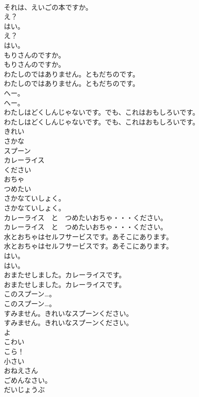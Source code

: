 \documentclass[8pt]{extreport}
\begin{document}
\begin{CJK}{UTF8}{min}
\\	それは、えいごの本ですか。 
\\	え？
\\	はい。	
\\	え？
\\	はい。 
\\	もりさんのですか。
\\	もりさんのですか。 
\\	わたしのではありません。ともだちのです。	
\\	わたしのではありません。ともだちのです。 
\\	へー。
\\	へー。
\\	わたしはどくしんじゃないです。でも、これはおもしろいです。	
\\	わたしはどくしんじゃないです。でも、これはおもしろいです。 
\\	きれい
\\	さかな
\\	スプーン
\\	カレーライス
\\	ください
\\	おちゃ
\\	つめたい
\\	さかなていしょく。	
\\	さかなていしょく。 
\\	カレーライス　と　つめたいおちゃ・・・ください。	
\\	カレーライス　と　つめたいおちゃ・・・ください。 
\\	水とおちゃはセルフサービスです。あそこにあります。	
\\	水とおちゃはセルフサービスです。あそこにあります。 
\\	はい。	
\\	はい。 
\\	おまたせしました。カレーライスです。	
\\	おまたせしました。カレーライスです。 
\\	このスプーン…。	
\\	このスプーン…。 
\\	すみません。きれいなスプーンください。	
\\	すみません。きれいなスプーンください。 
\\	よ
\\	こわい
\\	こら！
\\	小さい
\\	おねえさん
\\	ごめんなさい。
\\	だいじょうぶ

\end{CJK}
\end{document}

